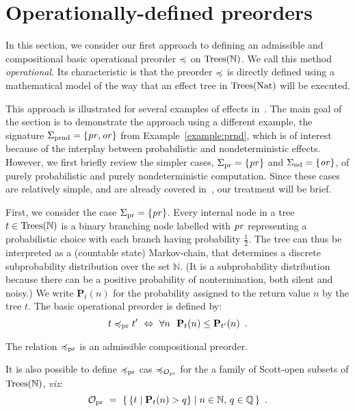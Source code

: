 \section{Operationally-defined preorders}

In this section, we consider our first approach to defining an admissible and compositional basic operational
preorder $\preccurlyeq$ on $\textnormal{Trees}(\mathbb{N})$. We call this method \emph{operational}. Its characteristic is that the preorder
 $\preccurlyeq$ is directly defined using a mathematical model of the way that an effect tree in $\textnormal{Trees}(\mathbb{\textnormal{Nat}})$ will be executed.

This approach is illustrated for several examples of effects in~\cite{gom}. 
The main goal of the section is to demonstrate the approach using a different example, the signature
$\Sigma_{\text{prnd}} = \{\operatorname{\mathit{pr}},\operatorname{\mathit{or}}\}$ from Example~\ref{example:prnd}, which is of interest because of the 
interplay between probabilistic and nondeterministic effects. However, we first
briefly review the simpler cases, $\Sigma_{\text{pr}} = \{\operatorname{\mathit{pr}}\}$ and $\Sigma_{\text{nd}} = \{\operatorname{\mathit{or}}\}$, of purely probabilistic and 
purely nondeterministic computation. Since these cases are relatively simple, and are already covered in~\cite{gom},
our treatment will be brief.

First, we  consider the case $\Sigma_{\text{pr}} = \{\operatorname{\mathit{pr}}\}$. Every internal node in a  tree $t \in \textnormal{Trees}(\mathbb{N})$  is a binary branching node labelled with $\operatorname{\mathit{pr}}$ representing a probabilistic choice with each branch having probability $\frac{1}{2}$. The tree can thus be interpreted as a (countable state) Markov-chain, that determines a discrete subprobability distribution over the set $\mathbb{N}$.
(It is a subprobability distribution because there can be a positive probability of nontermination, both silent and noisy.) We write
$\mathbf{P}_t (n)$ for the probability assigned to the return value $n$ by the tree $t$.
The basic operational preorder is defined by:
\[
t \preccurlyeq_{\text{pr}} t' ~ \Leftrightarrow ~ \forall n ~ ~ \mathbf{P}_t (n) \leq \mathbf{P}_{t'}(n) \enspace .
\]
\begin{aproposition}
The relation $\preccurlyeq_{\text{pr}}$ is an admissible compositional preorder. 
\end{aproposition}
\noindent
It is also possible to define $\preccurlyeq_{\text{pr}}$ cas $\preccurlyeq_{\mathcal{O}_{\text{pr}}}$ for the a family of Scott-open subsets of $\textnormal{Trees}(\mathbb{N})$, \emph{viz}:
\[
\mathcal{O}_{\text{pr}} ~ = ~ \{\,  \{t \mid \mathbf{P}_t (n) > q\} \mid n \in \mathbb{N}, \,q \in \mathbb{Q}\, \}  \enspace .
\]

